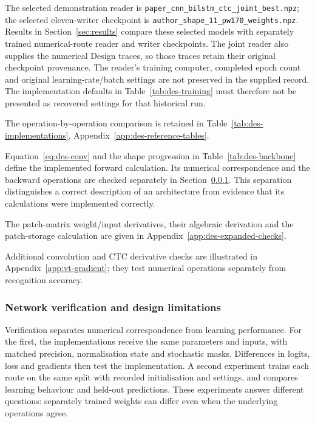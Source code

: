The selected demonstration reader is \texttt{paper\_cnn\_bilstm\_ctc\_joint\_best.npz}; the selected eleven-writer checkpoint is \texttt{author\_shape\_11\_pw170\_weights.npz}. Results in Section~\ref{sec:results} compare these selected models with separately trained numerical-route reader and writer checkpoints. The joint reader also supplies the numerical Design traces, so those traces retain their original checkpoint provenance. The reader's training computer, completed epoch count and original learning-rate/batch settings are not preserved in the supplied record. The implementation defaults in Table~\ref{tab:des-training} must therefore not be presented as recovered settings for that historical run.

The operation-by-operation comparison is retained in Table~\ref{tab:des-implementations}, Appendix~\ref{app:des-reference-tables}.

Equation~\ref{eq:des-conv} and the shape progression in Table~\ref{tab:des-backbone} define the implemented forward calculation. Its numerical correspondence and the backward operations are checked separately in Section~\ref{sec:des-netverify}. This separation distinguishes a correct description of an architecture from evidence that its calculations were implemented correctly.

The patch-matrix weight/input derivatives, their algebraic derivation and the patch-storage calculation are given in Appendix~\ref{app:des-expanded-checks}.

Additional convolution and CTC derivative checks are illustrated in Appendix~\ref{app:vt-gradient}; they test numerical operations separately from recognition accuracy.

\subsubsection{Network verification and design limitations}
\label{sec:des-netverify}
Verification separates numerical correspondence from learning performance. For the first, the implementations receive the same parameters and inputs, with matched precision, normalisation state and stochastic masks. Differences in logits, loss and gradients then test the implementation. A second experiment trains each route on the same split with recorded initialisation and settings, and compares learning behaviour and held-out predictions. These experiments answer different questions: separately trained weights can differ even when the underlying operations agree.

